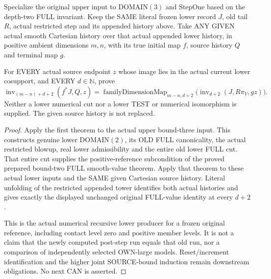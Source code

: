\begin{theorem}
\label{hir:original-stepone-bound-three-prepared-lower-full-smooth-values}
\leanok
Specialize the original upper input to DOMAIN$(3)$ and StepOne based on
the depth-two FULL invariant. Keep the SAME literal frozen lower record
$J$, old tail $R$, actual restricted step and its appended history above.
Take ANY GIVEN actual smooth Cartesian history over that actual appended
lower history, in positive ambient dimensions $m,n$, with its true initial
map $f$, source history $Q$ and terminal map $g$.

For EVERY actual source endpoint $z$ whose image lies in the actual
current lower cosupport, and EVERY $d\in\mathbb N$, prove
\[
 \operatorname{inv}_{(m-n)+d+2}(f^*J,Q,z)
  =\operatorname{familyDimensionMap}_{m-n,d+2}
       \bigl(\operatorname{inv}_{d+2}(J,R\pi_V,gz)\bigr).
\]
Neither a lower numerical cut nor a lower TEST or numerical isomorphism
is supplied. The given source history is not replaced.
\end{theorem}
\begin{proof}
Apply the first theorem to the actual upper bound-three input. This
constructs genuine lower DOMAIN$(2)$, its OLD FULL canonicality, the
actual restricted blowup, real lower admissibility and the entire old
lower FULL cut. That entire cut supplies the positive-reference
subcondition of the proved prepared bound-two FULL smooth-value theorem.
Apply that theorem to these actual lower inputs and the SAME given
Cartesian source history. Literal unfolding of the restricted appended
tower identifies both actual histories and gives exactly the displayed
unchanged original FULL-value identity at every $d+2$.

This is the actual numerical recursive lower producer for a frozen
original reference, including contact level zero and positive member
levels. It is not a claim that the newly computed post-step run equals
that old run, nor a comparison of independently selected OWN-large
models. Reset/increment identification and the higher joint SOURCE-bound
induction remain downstream obligations. No next CAN is asserted.
\end{proof}
